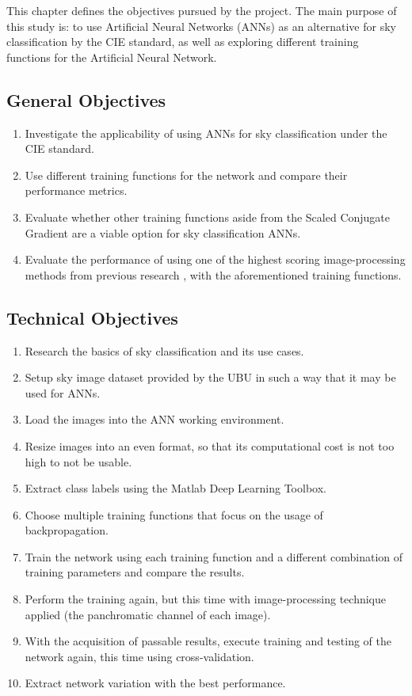 This chapter defines the objectives pursued by the project. The main purpose of this study is: to use Artificial Neural Networks (ANNs) as an alternative for sky classification by the CIE standard, as well as exploring different training functions for the Artificial Neural Network.
\subsection{General Objectives}
\begin{enumerate}
	\item Investigate the applicability of using ANNs for sky classification under the CIE standard.
	\item Use different training functions for the network and compare their performance metrics.
    \item Evaluate whether other training functions aside from the Scaled Conjugate Gradient are a viable option for sky classification ANNs.
    \item Evaluate the performance of using one of the highest scoring image-processing methods from previous research \cite{skyClassANN-Granados-Lopéz}, with the aforementioned training functions.
\end{enumerate}
\subsection{Technical Objectives}
\begin{enumerate}
    \item Research the basics of sky classification and its use cases.
    \item Setup sky image dataset provided by the UBU in such a way that it may be used for ANNs.
    \item Load the images into the ANN working environment.
    \item Resize images into an even format, so that its computational cost is not too high to not be usable.
    \item Extract class labels using the Matlab Deep Learning Toolbox.
    \item Choose multiple training functions that focus on the usage of backpropagation.
    \item Train the network using each training function and a different combination of training parameters and compare the results.
    \item Perform the training again, but this time with image-processing technique applied (the panchromatic channel of each image).
    \item With the acquisition of passable results, execute training and testing of the network again, this time using cross-validation.
    \item Extract network variation with the best performance.
\end{enumerate}
